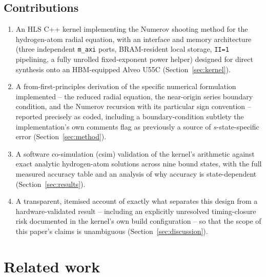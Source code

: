 \documentclass[pdflatex,sn-mathphys,Numbered]{sn-jnl}
\begin{document}
\subsection{Contributions}
\begin{enumerate}
\item An HLS C++ kernel implementing the Numerov shooting method for the hydrogen-atom radial equation, with an interface and memory architecture (three independent \texttt{m\_axi} ports, BRAM-resident local storage, \texttt{II=1} pipelining, a fully unrolled fixed-exponent power helper) designed for direct synthesis onto an HBM-equipped Alveo U55C (Section~\ref{sec:kernel}).
\item A from-first-principles derivation of the specific numerical formulation implemented -- the reduced radial equation, the near-origin series boundary condition, and the Numerov recursion with its particular sign convention -- reported precisely as coded, including a boundary-condition subtlety the implementation's own comments flag as previously a source of $s$-state-specific error (Section~\ref{sec:method}).
\item A software co-simulation (csim) validation of the kernel's arithmetic against exact analytic hydrogen-atom solutions across nine bound states, with the full measured accuracy table and an analysis of why accuracy is state-dependent (Section~\ref{sec:results}).
\item A transparent, itemised account of exactly what separates this design from a hardware-validated result -- including an explicitly unresolved timing-closure risk documented in the kernel's own build configuration -- so that the scope of this paper's claims is unambiguous (Section~\ref{sec:discussion}).
\end{enumerate}

\section{Related work}\label{sec:related}
\end{document}
